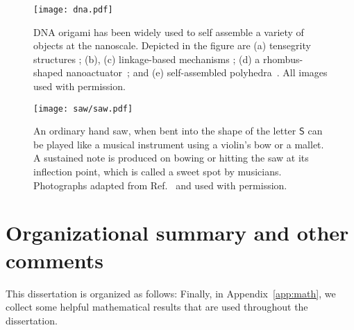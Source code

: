 \begin{figure}
  \begin{center}
    \texttt{[image: dna.pdf]}
  \end{center}
  \caption{DNA origami has been widely used to self assemble a variety of objects at the nanoscale.
    Depicted in the figure are (a) tensegrity structures \cite{liedl2010}; (b), (c) linkage-based mechanisms \cite{marras2015,zhou2015}; (d) a rhombus-shaped nanoactuator~\cite{ke2016}; and (e) self-assembled polyhedra~\cite{iinuma2014}.  All images used with permission.}
  \label{fig:dna_origami}
\end{figure}

\begin{figure}
  \begin{center}
    \texttt{[image: saw/saw.pdf]}
  \end{center}
  \caption{%
    An ordinary hand saw, when bent into the shape of the letter $\mathsf{S}$ can be played like a musical instrument using a violin's bow or a mallet.
    A sustained note is produced on bowing or hitting the saw at its inflection point, which is called a sweet spot by musicians.
    Photographs adapted from Ref.~\cite{shankar2022} and used with permission.
  }
  \label{fig:saw}
\end{figure}

\section{Organizational summary and other comments}

This dissertation is organized as follows:
Finally, in Appendix~\ref{app:math}, we collect some helpful mathematical results that are used throughout the dissertation.

